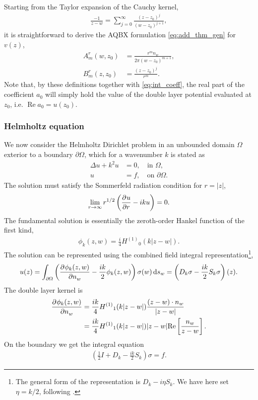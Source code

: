 \documentclass[hidelinks]{siamart1116}
\begin{document}
Starting from the Taylor expansion of the Cauchy kernel,
\begin{align}
  \frac{-1}{z-w} = \sum_{j=0}^\infty \frac{(z-z_0)^j}{(w-z_0)^{j+1}},
  \label{eq:cauchy_taylor}
\end{align}
it is straightforward to derive the AQBX formulation
\eqref{eq:add_thm_gen} for $v(z)$,
\begin{align}
  {A}_m^r(w, z_0) &=  \frac{r^m {{n}}_w}{2\pi (w-z_0)^{m+1}}, \\
  {B}_m^r(z, z_0) &= \frac{(z-z_0)^j}{r^m} .
\end{align}
Note that, by these definitions together with \eqref{eq:int_coeff},
the real part of the coefficient ${a}_0$ will simply hold the value
of the double layer potential evaluated at $z_0$, i.e. 
${\operatorname{Re}} {a}_0 = u(z_0)$.

\subsubsection{Helmholtz equation}
\label{sec:helmholtz-equation}

We now consider the Helmholtz Dirichlet problem in an unbounded domain
$\Omega$ exterior to a boundary ${{\partial\Omega}}$, which for a wavenumber $k$
is stated as
\begin{align}
  \Delta u + k^2 u &= 0, \quad \mbox{in } \Omega,\\
  u &= f, \quad \mbox{on } {{\partial\Omega}} .
\end{align}
The solution must satisfy the Sommerfeld radiation condition for $r = |z|$,
\begin{align}
  \label{eq:sommerfeld}
  \lim_{r \to \infty} r^{1/2}\left( \dpd{u}{r} - i k u \right) = 0 .
\end{align}
The fundamental solution is essentially the zeroth-order Hankel
function of the first kind,
\begin{align}
  \label{eq:fundsol}
  \phi_k(z, w) = \frac{i}{4} {H^{(1)}}_0(k|z-w|) .
\end{align}
The solution can be represented using the combined field integral
representation\footnote{The general form of the representation is
  $D_k - i\eta S_k$. We have here set $\eta = k/2$, following
  \cite{Helsing2015}.},
\begin{align}
  \label{eq:combfield}
  u(z) = \int_{{\partial\Omega}} \left(\dpd{\phi_k(z, w)}{n_w} - 
  \frac{ik}{2} \phi_k(z, w) \right) {\sigma}(w) \dif s_w
  = \left(D_k{\sigma} - \frac{ik}{2} S_k{\sigma} \right) (z) .
\end{align}
The double layer kernel is
\begin{align}
  \dpd{\phi_k(z, w)}{n_w}
  &= \frac{ik}{4} {H^{(1)}}_1(k|z-w|) \frac{(z-w) \cdot n_w}{|z-w|}  \\
  &= \frac{ik}{4} {H^{(1)}}_1(k|z-w|) |z-w| {\operatorname{Re}} \left[ \frac{n_w}{z-w} \right] .
    \label{eq:helmholtz_dbl_kern}
\end{align}
On the boundary we get the integral equation
\begin{align}
  \left( \frac{1}{2}I + D_k - \frac{ik}{2} S_k \right) {\sigma} = f .
  \label{eq:helmholtz_inteq}
\end{align}
\end{document}
